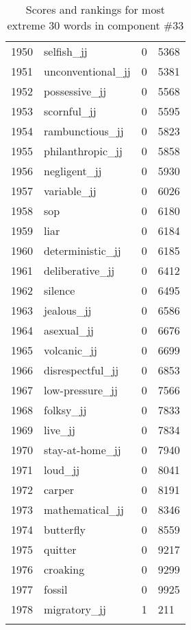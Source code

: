 \begin{longtable}[!htbp]{| rlr@{.}l |}
    1950 & selfish\_jj & 0 & 5368 \\
    1951 & unconventional\_jj & 0 & 5381 \\
    1952 & possessive\_jj & 0 & 5568 \\
    1953 & scornful\_jj & 0 & 5595 \\
    1954 & rambunctious\_jj & 0 & 5823 \\
    1955 & philanthropic\_jj & 0 & 5858 \\
    1956 & negligent\_jj & 0 & 5930 \\
    1957 & variable\_jj & 0 & 6026 \\
    1958 & sop & 0 & 6180 \\
    1959 & liar & 0 & 6184 \\
    1960 & deterministic\_jj & 0 & 6185 \\
    1961 & deliberative\_jj & 0 & 6412 \\
    1962 & silence & 0 & 6495 \\
    1963 & jealous\_jj & 0 & 6586 \\
    1964 & asexual\_jj & 0 & 6676 \\
    1965 & volcanic\_jj & 0 & 6699 \\
    1966 & disrespectful\_jj & 0 & 6853 \\
    1967 & low-pressure\_jj & 0 & 7566 \\
    1968 & folksy\_jj & 0 & 7833 \\
    1969 & live\_jj & 0 & 7834 \\
    1970 & stay-at-home\_jj & 0 & 7940 \\
    1971 & loud\_jj & 0 & 8041 \\
    1972 & carper & 0 & 8191 \\
    1973 & mathematical\_jj & 0 & 8346 \\
    1974 & butterfly & 0 & 8559 \\
    1975 & quitter & 0 & 9217 \\
    1976 & croaking & 0 & 9299 \\
    1977 & fossil & 0 & 9925 \\
    1978 & migratory\_jj & 1 & 211 \\
    \hline
    \caption{Scores and rankings for most extreme 30 words in component \#33} \\
\end{longtable}
